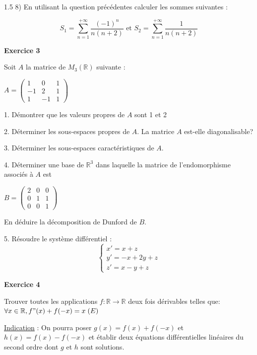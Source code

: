 \documentclass[12pt]{article}
\begin{document}
\begin{spacing}{1.5}
8) En utilisant la question précédentes calculer les sommes suivantes :

\[S_1=\sum_{n=1}^{+\infty}\frac{(-1)^n}{n(n+2)} \text{ et } S_2=\sum_{n=1}^{+\infty}\frac{1}{n(n+2)}\]

\medskip\textbf{Exercice 3 }

Soit $A$ la matrice de $M_3(\mathbb{R})$ suivante :

			$A=\begin{pmatrix}
			1 & 0 & 1 \\ 
			-1 & 2 & 1 \\ 
			1 & -1 & 1
			\end{pmatrix} $
			
1. Démontrer que les valeurs propres de $A$ sont 1 et 2

2. Déterminer les sous-espaces propres de $A$. La matrice $A$ est-elle diagonalisable?

3. Déterminer les sous-espaces caractéristiques de $A$.

4. Déterminer une base de $\mathbb{R}^3$ dans laquelle la matrice de l'endomorphisme associés à $A$ est

$B=\begin{pmatrix}
2 & 0 & 0 \\ 
0 & 1 & 1 \\ 
0 & 0 & 1
\end{pmatrix}$

En déduire la décomposition de Dunford de $B$.

5. Résoudre le système différentiel :
\[
\begin{cases}
x'=x+z\\
y'=-x+2y+z\\
z'=x-y+z
\end{cases}
\]

\medskip\textbf{Exercice 4 }

Trouver toutes les applications $f :\mathbb{R} \longrightarrow \mathbb{R}$ deux fois dérivables telles que: 
$\forall x \in \mathbb{R} , f"(x) + f(-x) = x \hspace{0.1cm}(E)$

\underline{Indication} : On pourra poser
$g(x) = f(x) + f(-x)$ et $h(x) = f(x) -f(-x)$ et établir deux équations différentielles linéaires du second ordre dont $g$ et $h$ sont solutions.


\quad
\quad

\end{spacing}
\end{document}

